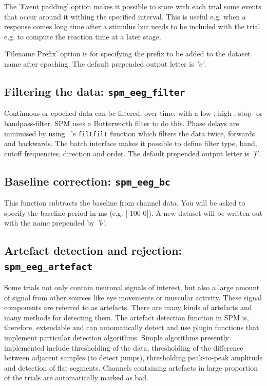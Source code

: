 The 'Event padding' option makes it possible to store with each trial some events that occur around it withing the specified interval. This is useful e.g. when a response comes long time after a stimulus but needs to be included with the trial e.g. to compute the reaction time at a later stage. 

'Filename Prefix' option is for specifying the prefix to be added to the dataset name after epoching. The default prepended output letter is \textit{'e'}.

\subsection{Filtering the data: \texttt{spm\_eeg\_filter}} 
Continuous or epoched data can be filtered, over time, with a low-, high-, stop- or bandpass-filter. SPM uses a Butterworth filter to do this. Phase delays are minimised by using \matlab\ 's \texttt{filtfilt} function which filters the data twice, forwards and backwards. The batch interface makes it possible to define filter type, band, cutoff frequencies, direction and order. The default prepended output letter is \textit{'f'}.


\subsection{Baseline correction: \texttt{spm\_eeg\_bc}} 
This function subtracts the baseline from channel data. You will be asked to specify the baseline period in ms (e.g. [-100 0]). A new dataset will be written out with the name prepended by \textit{'b'}.

\subsection{Artefact detection and rejection: \texttt{spm\_eeg\_artefact}}
Some trials not only contain neuronal signals of interest, but also a large amount of signal from other sources like eye movements or muscular activity. These signal components are referred to as artefacts. There are many kinds of artefacts and many methods for detecting them. The artefact detection function in SPM is, therefore, extendable and can automatically detect and use plugin functions that implement particular detection algorithms. Simple algorithms presently implemented include thresholding of the data, thresholding of the difference between adjacent samples (to detect jumps), thresholding peak-to-peak amplitude and detection of flat segments. Channels containing artefacts in large proportion of the trials are automatically marked as bad. 


